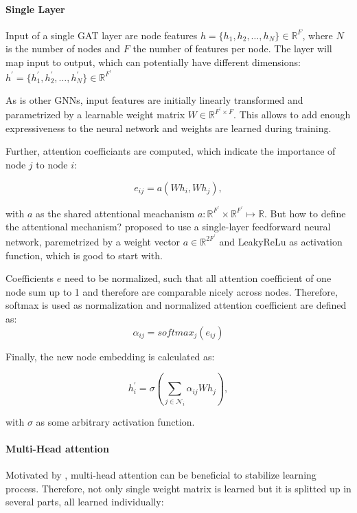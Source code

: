 \paragraph{Single Layer}
Input of a single GAT layer are node features $h = \{ h_1, h_2, \dots , h_N \} \in \mathbb{R}^F$, 
where $N$ is the number of nodes and $F$ the number of features per node. 
The layer will map input to output, which can potentially have different dimensions: 
$h^{\prime} = \{ h_1^{\prime}, h_2^{\prime}, \dots, h_N^{\prime} \} \in \mathbb{R}^{F^{\prime}} $

As is other GNNs, input features are initially 
linearly transformed and parametrized by a learnable weight matrix $W \in \mathbb{R}^{F^{\prime} \times F}$.
This allows to add enough expressiveness to the neural network and weights are learned during training.

Further, attention coefficiants are computed, which indicate the importance of node $j$ to node $i$:

\begin{equation}
  e_{ij} = a(Wh_i, Wh_j),
\end{equation}

with $a$ as the shared attentional meachanism $a : \mathbb{R}^{F^{\prime}} \times \mathbb{R}^{F^{\prime}} \mapsto \mathbb{R}$.
But how to define the attentional mechanism? 
\citet{GAT} proposed to use a single-layer feedforward neural network, paremetrized by a weight vector $a \in \mathbb{R}^{2F^{\prime}}$
and LeakyReLu as activation function, which is good to start with.
 
Coefficients $e$ need to be normalized, such that all attention coefficient of one node sum up to 1 and therefore are comparable nicely across nodes.
Therefore, softmax is used as normalization and normalized attention coefficient are defined as:
\begin{equation}
  \alpha_{ij} = softmax_j(e_{ij})
\end{equation}


Finally, the new node embedding is calculated as:

\begin{equation}
  h_i^{\prime} = \sigma \left( \sum_{j \in \mathcal{N}_i} \alpha_{ij} W h_j \right),
\end{equation}

with $\sigma$ as some arbitrary activation function.

\paragraph{Multi-Head attention}
Motivated by \citet{transformer}, multi-head attention can be beneficial to stabilize learning process.
Therefore, not only single weight matrix is learned but it is splitted up in several parts, 
all learned individually:

